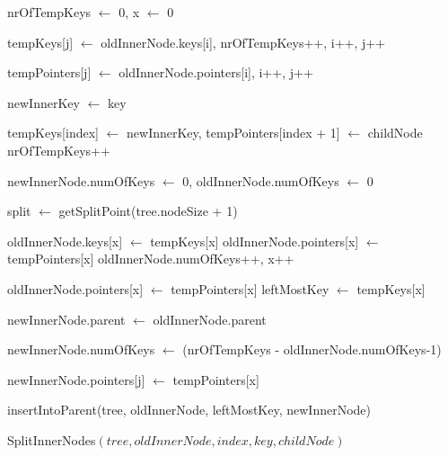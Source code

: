 \documentclass[abstracton,12pt,oneside]{scrreprt}
\begin{document}
\begin{algorithm}[H]
	\IncMargin{1em}
	\SetAlgoLined
	\DontPrintSemicolon
	
	
	nrOfTempKeys $\leftarrow$ 0, x $\leftarrow$ 0\;
	
	 {
		tempKeys[j] $\leftarrow$ oldInnerNode.keys[i], nrOfTempKeys++, i++, j++\;
		
	}
	
	 {
		tempPointers[j] $\leftarrow$ oldInnerNode.pointers[i], i++, j++\;
	}
	
	newInnerKey $\leftarrow$ key\;
	
	tempKeys[index] $\leftarrow$ newInnerKey, tempPointers[index + 1] $\leftarrow$ childNode\;
	nrOfTempKeys++\;
	
	newInnerNode.numOfKeys $\leftarrow$ 0, oldInnerNode.numOfKeys $\leftarrow$ 0\;
	
	split $\leftarrow$ getSplitPoint(tree.nodeSize + 1)\;
	
	
	 {
		oldInnerNode.keys[x] $\leftarrow$ tempKeys[x]\;
		oldInnerNode.pointers[x] $\leftarrow$ tempPointers[x]\;
		oldInnerNode.numOfKeys++, x++\;
		
	}
	oldInnerNode.pointers[x] $\leftarrow$ tempPointers[x]\;
	leftMostKey $\leftarrow$ tempKeys[x]\;
	
	newInnerNode.parent $\leftarrow$ oldInnerNode.parent\;
	
	newInnerNode.numOfKeys $\leftarrow$ (nrOfTempKeys - oldInnerNode.numOfKeys-1)\;
	
	
	newInnerNode.pointers[j] $\leftarrow$  tempPointers[x]\;
	
	
	insertIntoParent(tree, oldInnerNode, leftMostKey, newInnerNode)\;
	
	
	
	\caption{SplitInnerNodes$(tree, oldInnerNode, index, key, childNode)$}	\label{SplitInnerNodes}
\end{algorithm}
\end{document}
